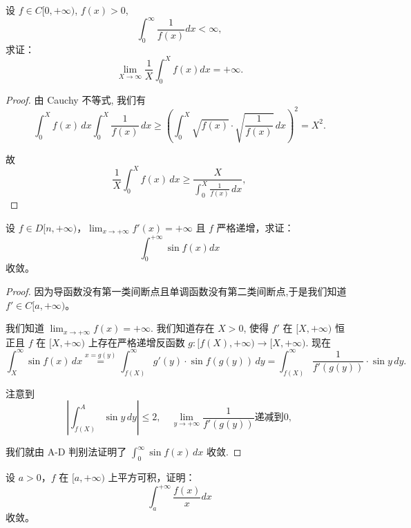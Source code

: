 \documentclass[lang=cn,10pt,thmcnt=section]{elegantbook}
\begin{document}
\begin{example}
	设 \( f \in C[0,+\infty) \), \( f(x) > 0 \),  
\[
\int_{0}^{\infty} \frac{1}{f(x)} dx < \infty,
\]
求证：  
\[
\lim_{X \to \infty} \frac{1}{X} \int_{0}^{X} f(x) dx = +\infty.
\]
\end{example}
\begin{proof}
	由 Cauchy 不等式, 我们有
\[
\int_0^X f(x) \, dx \int_0^X \frac{1}{f(x)} \, dx \ge \left( \int_0^X \sqrt{f(x)} \cdot \sqrt{\frac{1}{f(x)}} \, dx \right)^2 = X^2.
\]

\noindent
故
\[
\frac{1}{X} \int_0^X f(x) \, dx \ge \frac{X}{\int_0^X \frac{1}{f(x)} \, dx},
\]

\end{proof}
\begin{example}
	设 \( f \in D[n, +\infty) \)，\(\lim_{x \to +\infty} f'(x) = +\infty\) 且 \( f \) 严格递增，求证：  
\[
\int_0^{+\infty} \sin f(x) dx
\]  
收敛。
\end{example}
\begin{proof}
	因为导函数没有第一类间断点且单调函数没有第二类间断点,于是我们知道 $f' \in C[a, +\infty)$。

 我们知道 $\lim_{x\to+\infty} f(x) = +\infty$. 我们知道存在 $X > 0$, 使得 $f'$ 在 $[X, +\infty)$ 恒正且 $f$ 在 $[X, +\infty)$ 上存在严格递增反函数 $g: [f(X), +\infty) \to [X, +\infty)$. 现在
\[
\int_X^\infty \sin f(x) \, dx \stackrel{x=g(y)}{=} \int_{f(X)}^\infty g'(y) \cdot \sin f(g(y)) \, dy = \int_{f(X)}^\infty \frac{1}{f'(g(y))} \cdot \sin y \, dy.
\]

注意到
\[
\left| \int_{f(X)}^A \sin y \, dy \right| \le 2, \quad \lim_{y\to+\infty} \frac{1}{f'(g(y))} \text{递减到} 0,
\]

\noindent
我们就由 A-D 判别法证明了 $\int_0^\infty \sin f(x) \, dx$ 收敛.
\end{proof}
\begin{example}
	设 \( a > 0 \)，\( f \) 在 \([a, +\infty)\) 上平方可积，证明：  
\[
\int_a^{+\infty} \frac{f(x)}{x} dx
\]  
收敛。
\end{example}
\end{document}

